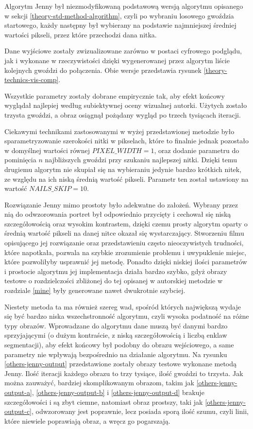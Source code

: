 \documentclass[a4paper, 12pt, polish, twoside]{extreport}
\begin{document}
        Algorytm Jenny był niezmodyfikowaną podstawową wersją algorytmu opisanego w sekcji \ref{theory-std-method-algorithm}, czyli po wybraniu losowego gwoździa startowego, każdy następny był wybierany na podstawie najmniejszej średniej wartości pikseli, przez które przechodzi dana nitka. 
        
        Dane wyjściowe zostały zwizualizowane zarówno w postaci cyfrowego podglądu, jak i wykonane w rzeczywistości dzięki wygenerowanej przez algorytm liście kolejnych gwoździ do połączenia. Obie wersje przedstawia rysunek \ref{theory-technics-vis-comp}.
        
        Wszystkie parametry zostały dobrane empirycznie tak, aby efekt końcowy wyglądał najlepiej według subiektywnej oceny wizualnej autorki. Użytych zostało trzysta gwoździ, a obraz osiągnął pożądany wygląd po trzech tysiącach iteracji.
        
        Ciekawymi technikami zastosowanymi w wyżej przedstawionej metodzie było sparametryzowanie szerokości nitki w pikselach, które to finalnie jednak pozostało w domyślnej wartości równej \(PIXEL\_WIDTH = 1\), oraz dodanie parametru do pominięcia \(n\) najbliższych gwoździ przy szukaniu najlepszej nitki. Dzięki temu drugiemu algorytm nie skupiał się na wybieraniu jedynie bardzo krótkich nitek, ze względu na ich niską średnią wartość pikseli. Parametr ten został ustawiony na wartość \(NAILS\_SKIP = 10\). 

        Rozwiązanie Jenny mimo prostoty było adekwatne do założeń. Wybrany przez nią do odwzorowania portret był odpowiednio przycięty i cechował się niską szczegółowością oraz wysokim kontrastem, dzięki czemu prosty algorytm oparty o średnią wartość pikseli na danej nitce okazał się wystarczający. Stworzeniu filmu opisującego jej rozwiązanie oraz przedstawieniu często nieoczywistych trudności, które napotkała, pozwala na szybkie zrozumienie problemu i uwypuklenie miejsc, które pozwoliłyby usprawnić jej metodę. Ponadto dzięki niskiej ilości parametrów i prostocie algorytmu jej implementacja działa bardzo szybko, gdyż obrazy testowe o rozdzielczości zbliżonej do tej opisanej w autorskiej metodzie w rozdziale \ref{mine} były generowane nawet dwukrotnie szybciej.
        
        Niestety metoda ta ma również szereg wad, spośród których największą wydaje się być bardzo niska wszechstronność algorytmu, czyli wysoka podatność na różne typy obrazów. Wprowadzane do algorytmu dane muszą być danymi bardzo sprzyjającymi (o dużym kontraście, z niską szczegółowością i liczbą enklaw segmentacji), aby efekt końcowy był podobny do obrazu wejściowego, a same parametry nie wpływają bezpośrednio na działanie algorytmu. Na rysunku \ref{others-jenny-output} przedstawione zostały obrazy testowe wykonane metodą Jenny. Ilość iteracji każdego obrazu to trzy tysiące, ilość gwoździ to trzysta. Jak można zauważyć, bardziej skomplikowanym obrazom, takim jak \ref{others-jenny-output-a}, \ref{others-jenny-output-b} i \ref{others-jenny-output-d} brakuje szczegółowości i są zbyt ciemne, natomiast obraz prostszy, taki jak \ref{others-jenny-output-c}, odwzorowany jest poprawnie, lecz posiada sporą ilość szumu, czyli linii, które niewiele poprawiają obraz, a wręcz go pogarszają.
        
\end{document}
